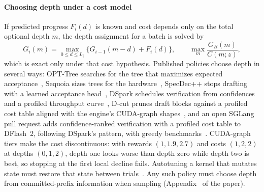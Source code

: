 \paragraph{Choosing depth under a cost model} If predicted progress $F_i(d)$ is known and cost depends only on the total optional depth $m$, the depth assignment for a batch is solved by
\begin{equation}
G_i(m)=\max_{0\le d\le L_i}\{G_{i-1}(m-d)+F_i(d)\},\qquad\max_m\frac{G_B(m)}{C(m;z)},\label{eq:schedDP}
\end{equation}
which is exact only under that cost hypothesis. Published policies choose depth in several ways: OPT-Tree searches for the tree that maximizes expected acceptance~\cite{opttree}, Sequoia sizes trees for the hardware~\cite{sequoia}, SpecDec++ stops drafting with a learned acceptance head~\cite{specdecpp}, DSpark schedules verification from confidences and a profiled throughput curve~\cite{dspark}, D-cut prunes draft blocks against a profiled cost table aligned with the engine's CUDA-graph shapes~\cite{dcut}, and an open SGLang pull request adds confidence-ranked verification with a profiled cost table to DFlash~2, following DSpark's pattern, with greedy benchmarks~\cite{pr36136}. CUDA-graph tiers make the cost discontinuous: with rewards $(1,1.9,2.7)$ and costs $(1,2,2)$ at depths $(0,1,2)$, depth one looks worse than depth zero while depth two is best, so stopping at the first local decline fails. Autotuning a kernel that mutates state must restore that state between trials~\cite{tritonautotune}. Any such policy must choose depth from committed-prefix information when sampling (Appendix~ of the paper).

